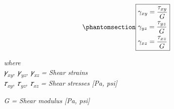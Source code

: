 \documentclass[
  letterpaper,
  DIV=11,
  numbers=noendperiod]{scrreprt}
\theoremstyle{definition}
\theoremstyle{remark}
\begin{document}
\begin{equation}\phantomsection\label{eq-4.8}{
\boxed{\begin{aligned}
& \gamma_{xy}=\frac{\tau_{xy}}{G} \\
& \gamma_{yz}=\frac{\tau_{yz}}{G} \\
& \gamma_{xz}=\frac{\tau_{xz}}{G}
\end{aligned}}
}\end{equation}

\emph{where}\\
\emph{𝛾\textsubscript{xy}, 𝛾\textsubscript{yz}, 𝛾\textsubscript{xz} =
Shear strains}\\
\emph{𝜏\textsubscript{xy}, 𝜏\textsubscript{yz}, 𝜏\textsubscript{xz} =
Shear stresses {[}Pa, psi{]}}

\emph{G = Shear modulus {[}Pa, psi{]}}
\end{document}

